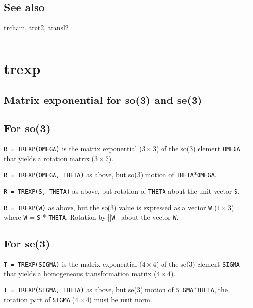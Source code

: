 \subsection*{See also}


\hyperlink{trchain}{\color{blue} trchain}, \hyperlink{trot2}{\color{blue} trot2}, \hyperlink{transl2}{\color{blue} transl2}

\vspace{1.5ex}\rule{\textwidth}{1mm}

\hypertarget{trexp}{\section*{trexp}}
\subsection*{Matrix exponential for so(3) and se(3)}

\subsection*{For so(3)}


\texttt{R = TREXP(OMEGA)} is the matrix exponential ($3 \times 3$) of the so(3) element \texttt{OMEGA} that
yields a rotation matrix ($3 \times 3$).



\texttt{R = TREXP(OMEGA, THETA)} as above, but so(3) motion of \texttt{THETA}*\texttt{OMEGA}.



\texttt{R = TREXP(S, THETA)} as above, but rotation of \texttt{THETA} about the unit vector \texttt{S}.



\texttt{R = TREXP(W)} as above, but the so(3) value is expressed as a vector \texttt{W}
($1 \times 3$) where \texttt{W} = \texttt{S} * \texttt{THETA}. Rotation by ||\texttt{W}|| about the vector \texttt{W}.


\subsection*{For se(3)}


\texttt{T = TREXP(SIGMA)} is the matrix exponential ($4 \times 4$) of the se(3) element \texttt{SIGMA} that
yields a homogeneous transformation  matrix ($4 \times 4$).



\texttt{T = TREXP(SIGMA, THETA)} as above, but se(3) motion of \texttt{SIGMA}*\texttt{THETA}, the
rotation part of \texttt{SIGMA} ($4 \times 4$) must be unit norm.



